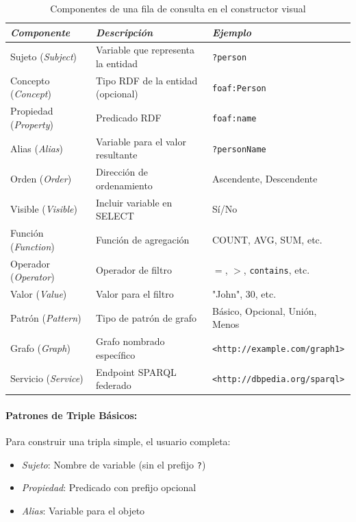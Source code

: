 \documentclass{article}
\begin{document}
\begin{table}[H]
\centering
\caption{Componentes de una fila de consulta en el constructor visual}
\label{tab:query-row-components}
\begin{tabular}{|p{3cm}|p{4cm}|p{7cm}|}
\hline
\textit{Componente} & \textit{Descripción} & \textit{Ejemplo} \\
\hline
Sujeto (\textit{Subject}) & Variable que representa la entidad & \texttt{?person} \\
\hline
Concepto (\textit{Concept}) & Tipo RDF de la entidad (opcional) & \texttt{foaf:Person} \\
\hline
Propiedad (\textit{Property}) & Predicado RDF & \texttt{foaf:name} \\
\hline
Alias (\textit{Alias}) & Variable para el valor resultante & \texttt{?personName} \\
\hline
Orden (\textit{Order}) & Dirección de ordenamiento & Ascendente, Descendente \\
\hline
Visible (\textit{Visible}) & Incluir variable en SELECT & Sí/No \\
\hline
Función (\textit{Function}) & Función de agregación & COUNT, AVG, SUM, etc. \\
\hline
Operador (\textit{Operator}) & Operador de filtro & $=$, $>$, \texttt{contains}, etc. \\
\hline
Valor (\textit{Value}) & Valor para el filtro & "John", 30, etc. \\
\hline
Patrón (\textit{Pattern}) & Tipo de patrón de grafo & Básico, Opcional, Unión, Menos \\
\hline
Grafo (\textit{Graph}) & Grafo nombrado específico & \texttt{<http://example.com/graph1>} \\
\hline
Servicio (\textit{Service}) & Endpoint SPARQL federado & \texttt{<http://dbpedia.org/sparql>} \\
\hline
\end{tabular}
\end{table}

\paragraph{Patrones de Triple Básicos:}
Para construir una tripla simple, el usuario completa:
\begin{itemize}
    \item \textit{Sujeto}: Nombre de variable (sin el prefijo \texttt{?})
    \item \textit{Propiedad}: Predicado con prefijo opcional
    \item \textit{Alias}: Variable para el objeto
\end{itemize}
\end{document}
